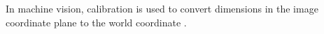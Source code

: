 \documentclass{article}
\begin{document}
	
	In machine vision, calibration is used to convert dimensions in the image coordinate plane to the world coordinate \cite{ise2005best}.
	
	\newpage
	
	
	
\end{document}
